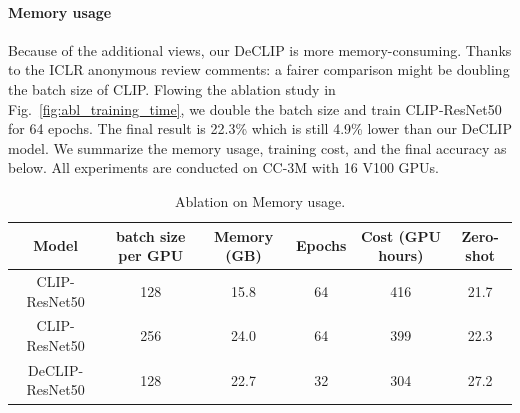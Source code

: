 \paragraph{Memory usage}
Because of the additional views, our DeCLIP is more memory-consuming.
Thanks to the ICLR anonymous review comments: a fairer comparison might be doubling the batch size of CLIP.
Flowing the ablation study in Fig.~\ref{fig:abl_training_time}, we double the batch size and train CLIP-ResNet50 for 64 epochs. The final result is 22.3\% which is still 4.9\% lower than our DeCLIP model. We summarize the memory usage, training cost, and the final accuracy as below. All experiments are conducted on CC-3M with 16 V100 GPUs.

\begin{table}[h]
\caption{\label{tab:ablation on memory usage} Ablation on Memory usage.}
\begin{center}
\begin{scriptsize}
\begin{sc}
\begin{tabular}{cccccc}
\toprule
\textbf{Model}           & \textbf{batch size per GPU} & \textbf{Memory (GB)} & \textbf{Epochs} & \textbf{Cost (GPU hours)} & \textbf{Zero-shot} \\
\midrule
CLIP-ResNet50   & 128                 & 15.8              & 64     & 416                       & 21.7                       \\
CLIP-ResNet50   & 256                 & 24.0              & 64     & 399                     & 22.3                        \\
DeCLIP-ResNet50 & 128                 & 22.7              & 32     & 304                       & 27.2 \\ 
\bottomrule
\end{tabular}
\end{sc}
\end{scriptsize}
\end{center}
\end{table}